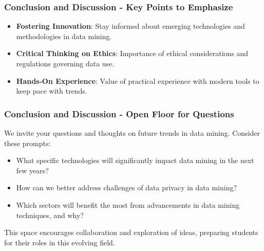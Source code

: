 \documentclass[aspectratio=169]{beamer}
\begin{document}
\begin{frame}[fragile]
    \frametitle{Conclusion and Discussion - Key Points to Emphasize}
    \begin{itemize}
        \item \textbf{Fostering Innovation}: Stay informed about emerging technologies and methodologies in data mining.
        \item \textbf{Critical Thinking on Ethics}: Importance of ethical considerations and regulations governing data use.
        \item \textbf{Hands-On Experience}: Value of practical experience with modern tools to keep pace with trends.
    \end{itemize}
\end{frame}

\begin{frame}[fragile]
    \frametitle{Conclusion and Discussion - Open Floor for Questions}
    We invite your questions and thoughts on future trends in data mining. Consider these prompts:
    
    \begin{itemize}
        \item What specific technologies will significantly impact data mining in the next few years?
        \item How can we better address challenges of data privacy in data mining?
        \item Which sectors will benefit the most from advancements in data mining techniques, and why?
    \end{itemize}
    
    This space encourages collaboration and exploration of ideas, preparing students for their roles in this evolving field.
\end{frame}
\end{document}
